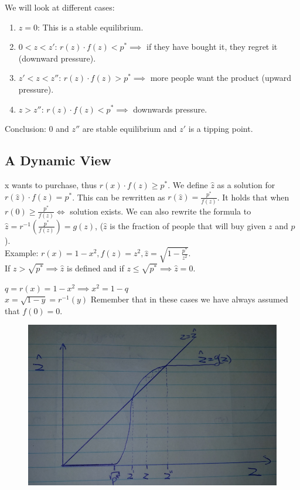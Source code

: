 \documentclass[12pt]{scrartcl}
\begin{document}
\noindent We will look at different cases:
\begin{enumerate}
\item $z = 0$: This is a stable equilibrium.
\item $ 0 < z < z'$: $r(z)\cdot f(z) < p^{*} \implies$ if they have bought it, they regret it (downward pressure).
\item $z'< z < z''$: $r(z)\cdot f(z) > p^{*} \implies$ more people want the product (upward pressure).
\item $z > z''$: $r(z)\cdot f(z) < p^{*} \implies$ downwards pressure. 
\end{enumerate}

\noindent Conclusion: 0 and $z''$ are stable equilibrium and $z'$ is a tipping point.



\subsection{A Dynamic View}
x wants to purchase, thus $r(x)\cdot f(z) \geq p^{*}$. We define $\hat{z}$ as a solution for $r(\hat{z})\cdot f(z) = p^{*}$. This can be rewritten as $r(\hat{z}) = \frac{p^{*}}{f(z)}$. It holds that when $r(0) \geq \frac{p^{*}}{f(z)} \iff$ solution exists. We can also rewrite the formula to $\hat{z} = r^{-1}(\frac{p^{*}}{f(z)}) = g(z)$, ($\hat{z}$ is the fraction of people that will buy given $z$ and $p$).\\

\noindent Example: $r(x) = 1 - x^{2}, f(z) = z^{2}, \hat{z} = \sqrt{1-\frac{p^{*}}{z^{2}}}$.\\
If $z > \sqrt{p^{*}} \implies \hat{z}$ is defined and if $z \leq \sqrt{p^{*}} \implies \hat{z} = 0$. 

\noindent $q = r(x) = 1 - x^{2} \implies x^{2} = 1 - q$\\
$x = \sqrt{1-y} = r^{-1}(y)$
Remember that in these cases we have always assumed that $f(0) = 0$.

\begin{figure}[h]
	\centering
	\includegraphics[width=\textwidth]{./images/graph_z_hat.png}
\end{figure}
\end{document}
